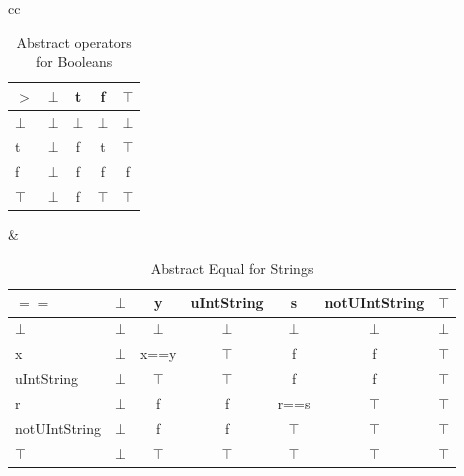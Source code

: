 \begin{table}[htbp]
\begin{tabular}{cc}
{\begin{tabular}{l|cccc}
$>$    & $\bot$ & t      & f      & $\top$ \\\hline
$\bot$ & $\bot$ & $\bot$ & $\bot$ & $\bot$ \\
t      & $\bot$ & f      & t      & $\top$ \\
f      & $\bot$ & f      & f      & f \\
$\top$ & $\bot$ & f      & $\top$ & $\top$
\end{tabular}
} &
\end{tabular}
\caption{Abstract operators for Booleans}
\end{table}

\begin{table}[htbp]
\centering
\begin{tabular}{l|cccccc}
$==$          & $\bot$ & y      & uIntString & s      & notUIntString & $\top$ \\\hline
$\bot$        & $\bot$ & $\bot$ & $\bot$     & $\bot$ & $\bot$        & $\bot$ \\
x             & $\bot$ & x==y   & $\top$     & f      & f             & $\top$ \\
uIntString    & $\bot$ & $\top$ & $\top$     & f      & f             & $\top$ \\
r             & $\bot$ & f      & f          & r==s   & $\top$        & $\top$ \\
notUIntString & $\bot$ & f      & f          & $\top$ & $\top$        & $\top$ \\
$\top$        & $\bot$ & $\top$ & $\top$     & $\top$ & $\top$        & $\top$
\end{tabular}
\caption{Abstract Equal for Strings}
\label{tab:abstract_equal_string}
\end{table}

